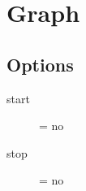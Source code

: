 \section{Graph}

\subsection{Options}
\begin{description}
\item[start] = no
\item[stop] = no
\end{description}